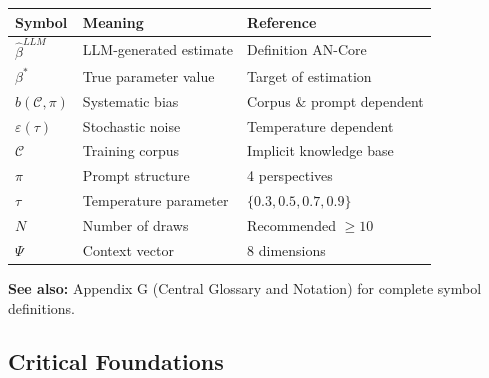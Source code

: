 \begin{center}
\begin{tabular}{@{}lll@{}}
\toprule
\textbf{Symbol} & \textbf{Meaning} & \textbf{Reference} \\
\midrule
$\hat{\beta}^{LLM}$ & LLM-generated estimate & Definition AN-Core \\
$\beta^*$ & True parameter value & Target of estimation \\
$b(\mathcal{C}, \pi)$ & Systematic bias & Corpus \& prompt dependent \\
$\varepsilon(\tau)$ & Stochastic noise & Temperature dependent \\
$\mathcal{C}$ & Training corpus & Implicit knowledge base \\
$\pi$ & Prompt structure & 4 perspectives \\
$\tau$ & Temperature parameter & $\{0.3, 0.5, 0.7, 0.9\}$ \\
$N$ & Number of draws & Recommended $\geq 10$ \\
$\Psi$ & Context vector & 8 dimensions \\
\bottomrule
\end{tabular}
\end{center}

\textbf{See also:} Appendix G (Central Glossary and Notation) for complete symbol definitions.


\subsection{Critical Foundations}
\label{sec:AN-foundations}

